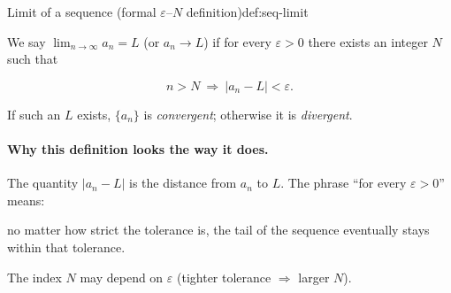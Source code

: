 
\begin{center}
\end{center}

\begin{definition}{Limit of a sequence (formal $\varepsilon$--$N$ definition)}{def:seq-limit}

We say $\displaystyle \lim_{n\to\infty} a_n = L$ (or $a_n\to L$) if for every $\varepsilon>0$ there exists an integer $N$ such that

\[
n>N \ \Longrightarrow\ |a_n-L|<\varepsilon.
\]

If such an $L$ exists, $\{a_n\}$ is \emph{convergent}; otherwise it is \emph{divergent}.

\end{definition}

\paragraph{Why this definition looks the way it does.}

The quantity $|a_n-L|$ is the distance from $a_n$ to $L$. The phrase ``for every $\varepsilon>0$'' means:

no matter how strict the tolerance is, the tail of the sequence eventually stays within that tolerance.

The index $N$ may depend on $\varepsilon$ (tighter tolerance $\Rightarrow$ larger $N$).

